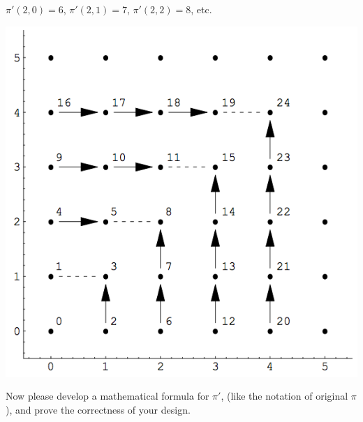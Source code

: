 \documentclass[12pt,a4paper]{article}
\theoremstyle{definition}
\numberwithin{equation}{section}
\numberwithin{figure}{section}
\begin{document}
\begin{enumerate}
\begin{minipage}[t]{0.68\linewidth}
    $\pi'(2,0)=6$, $\pi'(2,1)=7$, $\pi'(2,2)=8$, etc.
  \end{minipage}
  \hspace{1mm}
  \begin{minipage}[t]{0.32\linewidth}
  \vspace{0pt}
    \includegraphics[width=\columnwidth]{Fig-Pairing.png}
  \end{minipage}

  Now please develop a mathematical formula for $\pi'$, (like the notation of original $\pi$),  and prove the correctness of your design.


\end{enumerate}


\end{document}
